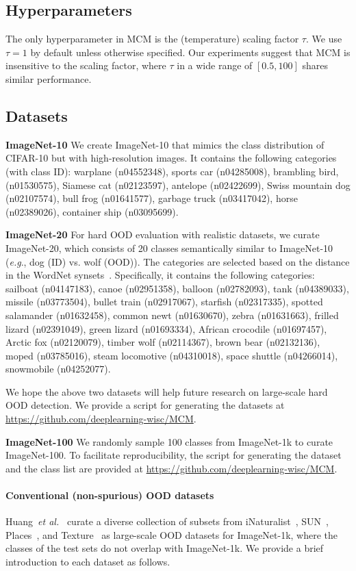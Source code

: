 \documentclass{article}
\def\eg{\emph{e.g}., }
\def\etal{\emph{et al.}}
\begin{document}
\subsection{Hyperparameters} The only hyperparameter in MCM is the (temperature) scaling factor $\tau$. We use $\tau=1$ by default unless otherwise specified. Our experiments suggest that MCM is insensitive to the scaling factor, where $\tau$ in a wide range of $[0.5, 100]$ shares similar performance.

\subsection{Datasets}

\textbf{ImageNet-10} We create ImageNet-10 that mimics the class distribution of CIFAR-10 but with high-resolution images. It contains the following categories (with class ID): warplane (n04552348), sports car (n04285008), brambling bird, (n01530575), Siamese cat (n02123597), antelope (n02422699), Swiss mountain dog (n02107574), bull frog (n01641577), garbage truck (n03417042), horse (n02389026), container ship (n03095699).

\textbf{ImageNet-20} For hard OOD evaluation with realistic datasets, we curate ImageNet-20, which consists of 20 classes semantically similar  to ImageNet-10 (\eg dog (ID) vs. wolf (OOD)). The categories are selected based on the distance in the WordNet synsets~\cite{fellbaum2010wordnet}. Specifically, it contains the following categories: sailboat (n04147183), canoe (n02951358), balloon (n02782093), tank (n04389033), missile (n03773504), bullet train (n02917067), starfish (n02317335), spotted salamander (n01632458), common newt (n01630670), zebra (n01631663), frilled lizard (n02391049), green lizard (n01693334), African crocodile (n01697457), Arctic fox (n02120079), timber wolf (n02114367), brown bear (n02132136), moped (n03785016), steam locomotive (n04310018), space shuttle (n04266014), snowmobile (n04252077).

We hope the above two datasets will help future research on large-scale hard OOD detection. We provide a script for generating the datasets at 
\url{https://github.com/deeplearning-wisc/MCM}.

\textbf{ImageNet-100} We randomly sample 100 classes from ImageNet-1k to curate ImageNet-100. To facilitate reproducibility, the script for generating the dataset and the class list are provided at \url{https://github.com/deeplearning-wisc/MCM}.

\paragraph{Conventional (non-spurious) OOD datasets} Huang~\etal~\cite{huang2021mos} curate a diverse collection of subsets from iNaturalist~\cite{van2018inaturalist}, SUN~\cite{xiao2010sun}, Places~\cite{zhou2017places}, and Texture~\cite{cimpoi2014describing} as large-scale OOD datasets for ImageNet-1k, where the classes of the test sets do not overlap with ImageNet-1k. We provide a brief introduction to each dataset as follows.
 
\end{document}
